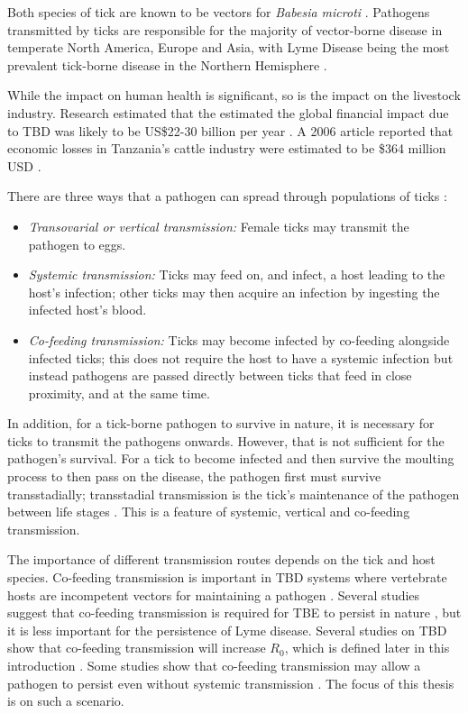 \documentclass[hidelinks]{article}
\begin{document}
Both species of tick are known to be vectors for \textit{Babesia microti} \citep{Gray2024, Rubel_2023}. Pathogens transmitted by ticks are responsible for the majority of vector-borne disease in temperate North America, Europe and Asia, with Lyme Disease being the most prevalent tick-borne disease in the Northern Hemisphere \citep{Rochlin2020}. 

While the impact on human health is significant, so is the impact on the livestock industry. Research estimated that the estimated the global financial impact due to TBD was likely to be US\$22-30 billion per year \citep{Lew_Tabor_2016}. A 2006 article reported that economic losses in Tanzania's cattle industry were estimated to be \$364 million USD \citep{Kivaria2006}.

There are three ways that a pathogen can spread through populations of ticks \citep{HARRISON2012}:
\begin{itemize}
	\item \textit{Transovarial or vertical transmission:} Female ticks may transmit the pathogen to eggs.
	\item \textit{Systemic transmission:} Ticks may feed on, and infect, a host leading to the host's infection; other ticks may then acquire an infection by ingesting the infected host's blood.
	\item \textit{Co-feeding transmission:} Ticks may become infected by co-feeding alongside infected ticks; this does not require the host to have a systemic infection but instead pathogens are passed directly between ticks that feed in close proximity, and at the same time.
\end{itemize}

In addition, for a tick-borne pathogen to survive in nature, it is necessary for ticks to transmit the pathogens onwards. However, that is not sufficient for the pathogen's survival. For a tick to become infected and then survive the moulting process to then pass on the disease, the pathogen first must survive transstadially; transstadial transmission is the tick's maintenance of the pathogen between life stages \citep{Johnson2023d}. This is a feature of systemic, vertical and co-feeding transmission.

The importance of different transmission routes depends on the tick and host species. Co-feeding transmission is important in TBD systems where vertebrate hosts are incompetent vectors for maintaining a pathogen \citep{HARRISON2012}. Several studies suggest that co-feeding transmission is required for TBE to persist in nature \citep{Hartemink2008, HARRISON2012}, but it is less important for the persistence of Lyme disease. Several studies on TBD show that co-feeding transmission will increase $ R_0 $, which is defined later in this introduction \citep{JohnstoneRobertson2020, Rosa2003, Norman2004}. Some studies show that co-feeding transmission may allow a pathogen to persist even without systemic transmission \citep{Rosa2003, Norman2004}. The focus of this thesis is on such a scenario.
\end{document}
